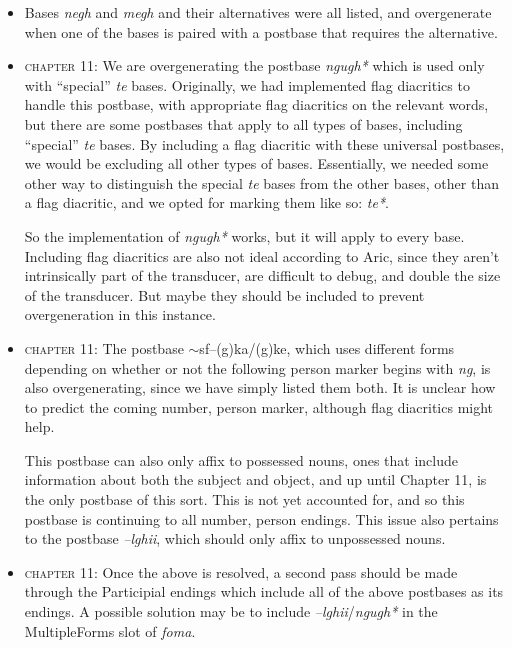 \documentclass{article}
\begin{document}
\begin{itemize}
\renewcommand\labelitemi{$\cdot$}

\item Bases \textit{negh} and \textit{megh} and their alternatives were all listed, and overgenerate when one of the bases is paired with a postbase that requires the alternative.

\item \textsc{chapter 11}: We are overgenerating the postbase \textit{ngugh*} which is used only with ``special'' \textit{te} bases.
%
Originally, we had implemented flag diacritics to handle this postbase, with appropriate flag diacritics on the relevant words, but there are some postbases that apply to all types of bases, including ``special'' \textit{te} bases.
%
By including a flag diacritic with these universal postbases, we would be excluding all other types of bases.
%
Essentially, we needed some other way to distinguish the special \textit{te} bases from the other bases, other than a flag diacritic, and we opted for marking them like so: \textit{te*}.

So the implementation of \textit{ngugh*} works, but it will apply to every base.
%
Including flag diacritics are also not ideal according to Aric, since they aren't intrinsically part of the transducer, are difficult to debug, and double the size of the transducer.
%
But maybe they should be included to prevent overgeneration in this instance.

\item \textsc{chapter 11}: The postbase $\sim$sf--(g)ka/(g)ke, which uses different forms depending on whether or not the following person marker begins with \textit{ng}, is also overgenerating, since we have simply listed them both.
%
It is unclear how to predict the coming number, person marker, although flag diacritics might help.

This postbase can also only affix to possessed nouns, ones that include information about both the subject and object, and up until Chapter 11, is the only postbase of this sort.
%
This is not yet accounted for, and so this postbase is continuing to all number, person endings.
%
This issue also pertains to the postbase \textit{--lghii}, which should only affix to unpossessed nouns.

\item \textsc{chapter 11}: Once the above is resolved, a second pass should be made through the Participial endings which include all of the above postbases as its endings.
%
A possible solution may be to include \textit{--lghii}/\textit{ngugh*} in the MultipleForms slot of \textit{foma}.


\end{itemize}
\end{document}
